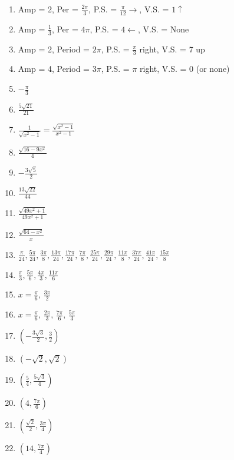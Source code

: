 \documentclass{article}
\begin{document}
\begin{enumerate}
    \item Amp = 2, Per = $\frac{2\pi}{3}$, P.S. = $\frac{\pi}{12} \rightarrow$, V.S. = $1 \uparrow$
    \item Amp = $\frac{1}{3}$, Per = $4\pi$, P.S. = $4 \leftarrow$, V.S. = None
    \item Amp = 2, Period = $2\pi$, P.S. = $\frac{\pi}{3}$ right, V.S. = 7 up
    \item Amp = 4, Period = $3\pi$, P.S. = $\pi$ right, V.S. = 0 (or none)
    
    \item $-\frac{\pi}{3}$
    \item $\frac{5\sqrt{21}}{21}$
    \item $\frac{1}{\sqrt{x^2-1}} = \frac{\sqrt{x^2-1}}{x^2-1}$
    \item $\frac{\sqrt{16-9x^2}}{4}$
    \item $-\frac{3\sqrt{5}}{2}$
    \item $\frac{13\sqrt{22}}{44}$
    \item $\frac{\sqrt{49x^2+1}}{49x^2+1}$
    \item $\frac{\sqrt{64-x^2}}{x}$
    
    \item $\frac{\pi}{24}, \frac{5\pi}{24}, \frac{3\pi}{8}, \frac{13\pi}{24}, \frac{17\pi}{24}, \frac{7\pi}{8}, \frac{25\pi}{24}, \frac{29\pi}{24}, \frac{11\pi}{8}, \frac{37\pi}{24}, \frac{41\pi}{24}, \frac{15\pi}{8}$
    
	\item $\frac{\pi}{3}, \frac{5\pi}{6}, \frac{4\pi}{3}, \frac{11\pi}{6}$
	
	\item $x = \frac{\pi}{6}, \, \frac{3\pi}{2}$
	
	\item $x = \frac{\pi}{6}, \, \frac{2\pi}{3}, \, \frac{7\pi}{6}, \, \frac{5\pi}{3}$
    
    \item $\left(-\frac{3\sqrt{3}}{2}, \frac{3}{2}\right)$
    \item $(-\sqrt{2}, \sqrt{2})$
    \item $\left(\frac{5}{4}, \frac{5\sqrt{3}}{4}\right)$
    
    \item $\left(4, \frac{7\pi}{6}\right)$
    \item $\left(\frac{\sqrt{2}}{2}, \frac{3\pi}{4}\right)$
    \item $\left(14, \frac{7\pi}{4}\right)$
\end{enumerate}
\end{document}
